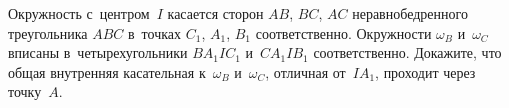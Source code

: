 \begin{problems}
\item
Окружность с~центром~$I$ касается сторон $AB$, $BC$, $AC$ неравнобедренного
треугольника $ABC$ в~точках $C_1$, $A_1$, $B_1$ соответственно.
Окружности $\omega_B$ и~$\omega_C$ вписаны в~четырехугольники
$B A_1 I C_1$ и~$C A_1 I B_1$ соответственно.
Докажите, что общая внутренняя касательная к~$\omega_B$ и~$\omega_C$,
отличная от~$I A_1$, проходит через точку~$A$.

\end{problems}

